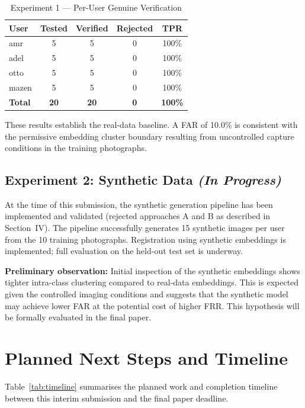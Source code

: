 \documentclass[conference]{IEEEtran}
\begin{document}
\begin{table}[H]
\centering
\caption{Experiment 1 — Per-User Genuine Verification}
\label{tab:exp1_user}
\renewcommand{\arraystretch}{1.2}
\begin{tabular}{lcccc}
\toprule
User & Tested & Verified & Rejected & TPR \\
\midrule
amr   & 5 & 5 & 0 & 100\% \\
adel  & 5 & 5 & 0 & 100\% \\
otto  & 5 & 5 & 0 & 100\% \\
mazen & 5 & 5 & 0 & 100\% \\
\midrule
\textbf{Total} & \textbf{20} & \textbf{20} & \textbf{0} & \textbf{100\%} \\
\bottomrule
\end{tabular}
\end{table}

These results establish the real-data baseline. A FAR of 10.0\% is consistent with the permissive embedding cluster boundary resulting from uncontrolled capture conditions in the training photographs.

\subsection{Experiment 2: Synthetic Data \textit{(In Progress)}}

At the time of this submission, the synthetic generation pipeline has been implemented and validated (rejected approaches A and B as described in Section~IV). The pipeline successfully generates 15 synthetic images per user from the 10 training photographs. Registration using synthetic embeddings is implemented; full evaluation on the held-out test set is underway.

\textbf{Preliminary observation:} Initial inspection of the synthetic embeddings shows tighter intra-class clustering compared to real-data embeddings. This is expected given the controlled imaging conditions and suggests that the synthetic model may achieve lower FAR at the potential cost of higher FRR. This hypothesis will be formally evaluated in the final paper.

\section{Planned Next Steps and Timeline}

Table~\ref{tab:timeline} summarises the planned work and completion timeline between this interim submission and the final paper deadline.
\end{document}
